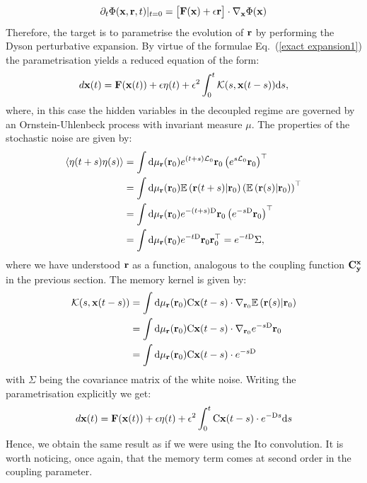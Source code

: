 \documentclass[12pt]{article}
\begin{document}
\begin{equation}
\partial _t \Phi (\mathbf{x},\mathbf{r},t)|_{t=0}=\begin{bmatrix}\mathbf{F}(\mathbf{x})+\epsilon \mathbf{r} \end{bmatrix}\cdot \nabla _{\mathbf{x}} \Phi(\mathbf{x}) 
\end{equation}
 Therefore, the target is to parametrise the evolution of $\mathbf{r}$ by performing the Dyson perturbative expansion. By virtue of the formulae Eq.~(\ref{exact expansion1})  the parametrisation yields a reduced equation of the form:
\begin{equation}
d\mathbf{x}(t)=\mathbf{F}(\mathbf{x}(t)) + \epsilon \eta (t) + \epsilon^2 \int _0^t\mathcal{K}(s , \mathbf{x}(t-s))\mathrm{d} s,
\end{equation}
where, in this case the hidden variables in the decoupled regime are governed by an Ornstein-Uhlenbeck process with invariant measure $\mu$. The properties of the stochastic noise are given by:
\begin{align}\label{msm wl}
	\left\langle \eta(t+s)\eta(s) \right\rangle  &= \int \mathrm{d} \mu_{\mathbf{r}}(\mathbf{r}_0) e^{(t+s)\mathcal{L}_0} \mathbf{r}_0\left(e^{s\mathcal{L}_0} \mathbf{r}_0\right)^{\top} \\&= \int \mathrm{d} \mu_{\mathbf{r}}(\mathbf{r}_0) \mathbb{E}\left(\mathbf{r}(t+s)|\mathbf{r}_0 \right)\left(\mathbb{E}\left(\mathbf{r}(s)|\mathbf{r}_0 \right)\right)^{\top} \\
	&= \int \mathrm{d} \mu_{\mathbf{r}}(\mathbf{r}_0) e^{-(t+s)\mathrm{D}} \mathbf{r}_0\left(e^{-s\mathrm{D}} \mathbf{r}_0\right)^{\top} 	
	\\
	&= \int \mathrm{d} \mu_{\mathbf{r}}(\mathbf{r}_0) e^{-t\mathrm{D}} \mathbf{r}_0\mathbf{r}_0^{\top} = e^{-t\mathrm{D}}\Sigma,
\end{align}
where we have understood $\mathbf{r}$ as a function, analogous to the coupling function $\mathbf{C}^{\mathbf{x}}_{\mathbf{y}}$ in the previous section. The memory kernel is given by:
\begin{align}
	\mathcal{K}(s,\mathbf{x}(t-s))&=\int \mathrm{d} \mu_{\mathbf{r}}(\mathbf{r}_0) \mathrm{C}\mathbf{x}(t-s)\cdot \nabla_{\mathbf{r}_0}\mathbb{E}\left( \mathbf{r}(s)|\mathbf{r}_0 \right)\\&=\int \mathrm{d} \mu_{\mathbf{r}}(\mathbf{r}_0) \mathrm{C}\mathbf{x}(t-s)\cdot \nabla_{\mathbf{r}_0}e^{-s\mathrm{D}}\mathbf{r}_0
	\\&=\int \mathrm{d} \mu_{\mathbf{r}}(\mathbf{r}_0) \mathrm{C}\mathbf{x}(t-s)\cdot e^{-s\mathrm{D}}
\end{align}
with $\Sigma$ being the covariance matrix of the white noise. Writing the parametrisation explicitly we get:
\begin{equation}
d\mathbf{x}(t)=\mathbf{F}(\mathbf{x}(t)) + \epsilon \eta (t) + \epsilon^2 \int _0^t\mathrm{C}\mathbf{x}(t-s)\cdot e^{-\mathrm{D}s}\mathrm{d} s
\end{equation}
Hence, we obtain the same result as if we were using the Ito convolution. It is worth noticing, once again, that the memory term comes at second order in the coupling parameter.
\end{document}
